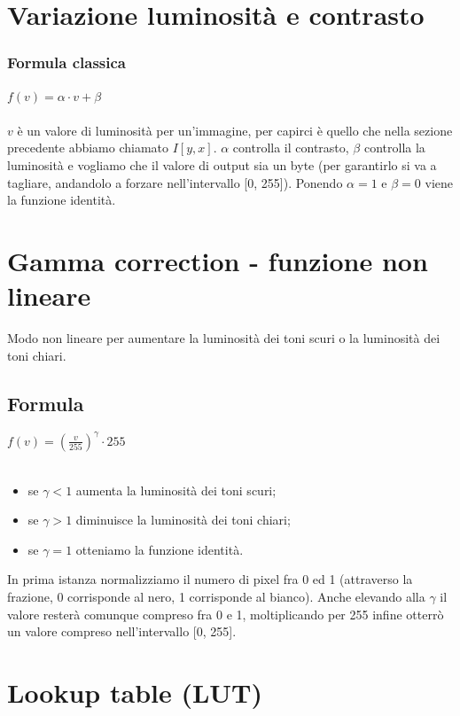 \section{Variazione luminosità e contrasto}

\subsubsection{Formula classica}

$f(v) = \alpha \cdot v + \beta$ \\\\
$v$ è un valore di luminosità per un'immagine, per capirci è quello che nella sezione precedente abbiamo chiamato $I[y, x]$. $\alpha$ controlla il contrasto, $\beta$ controlla la luminosità e vogliamo che il valore di output sia un byte (per garantirlo si va a tagliare, andandolo a forzare nell'intervallo [0, 255]). Ponendo $\alpha = 1$ e $\beta = 0$ viene la funzione identità.

\newpage

\section{Gamma correction - funzione non lineare}

Modo non lineare per aumentare la luminosità dei toni scuri o la luminosità dei toni chiari.
\subsection{Formula}

$f(v) = (\tfrac{v}{255})^{\gamma} \cdot 255$ \\\\
\begin{itemize}
	\item se $\gamma < 1$ aumenta la luminosità dei toni scuri;
	\item se $\gamma > 1$ diminuisce la luminosità dei toni chiari; 
	\item se $\gamma = 1$ otteniamo la funzione identità.
\end{itemize}
In prima istanza normalizziamo il numero di pixel fra 0 ed 1 (attraverso la frazione, 0 corrisponde al nero, 1 corrisponde al bianco). Anche elevando alla $\gamma$ il valore resterà comunque compreso fra 0 e 1, moltiplicando per 255 infine otterrò un valore compreso nell'intervallo [0, 255].

\section{Lookup table (LUT)}

